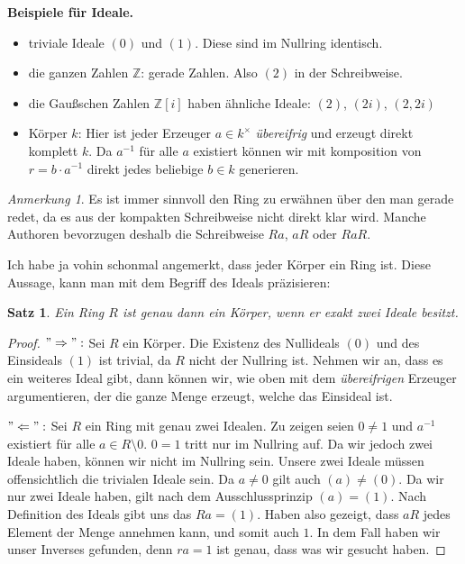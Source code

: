 \documentclass{article}
\newtheorem*{satz}{Satz}
\theoremstyle{definition}
\theoremstyle{remark}
\newtheorem*{anm}{Anmerkung}
\begin{document}
\vspace{0.7em}
\textbf{Beispiele für Ideale.}
\begin{itemize}
    \item triviale Ideale $(0)$ und $(1)$. Diese sind im Nullring identisch.
    \item die ganzen Zahlen $\mathbb Z$: gerade Zahlen. Also $(2)$ in der Schreibweise.
    \item die Gaußschen Zahlen $\mathbb Z[i]$ haben ähnliche Ideale: $(2)$, $(2i)$, $(2,2i)$
    \item Körper $k$: Hier ist jeder Erzeuger $a\in k^\times$ \emph{übereifrig} und erzeugt direkt komplett $k$.
    Da $a^{-1}$ für alle $a$ existiert können wir mit komposition von $r=b\cdot a^{-1}$ direkt jedes beliebige
    $b\in k$ generieren.
\end{itemize}

\begin{anm}
Es ist immer sinnvoll den Ring zu erwähnen über den man gerade redet, da es aus der kompakten Schreibweise
nicht direkt klar wird. Manche Authoren bevorzugen deshalb die Schreibweise $Ra$, $aR$ oder $RaR$.
\end{anm}

Ich habe ja vohin schonmal angemerkt, dass jeder Körper ein Ring ist. Diese Aussage, kann man mit dem
Begriff des Ideals präzisieren:

\begin{satz}
Ein Ring $R$ ist genau dann ein Körper, wenn er exakt zwei Ideale besitzt.
\end{satz}
\begin{proof} $"\Rightarrow":$ Sei $R$ ein Körper. Die Existenz des Nullideals $(0)$ und des Einsideals $(1)$
ist trivial, da $R$ nicht der Nullring ist. Nehmen wir an, dass es ein weiteres Ideal gibt, dann können wir,
wie oben mit dem \emph{übereifrigen} Erzeuger argumentieren, der die ganze Menge erzeugt, welche das Einsideal
ist.

\vspace{0.7em}
$"\Leftarrow":$ Sei $R$ ein Ring mit genau zwei Idealen. Zu zeigen seien $0\ne1$ und $a^{-1}$ existiert für
alle $a\in R\setminus 0$. $0=1$ tritt nur im Nullring auf. Da wir jedoch zwei Ideale haben, können wir nicht im
Nullring sein. Unsere zwei Ideale müssen offensichtlich die trivialen Ideale sein. Da $a\ne0$ gilt auch
$(a)\ne(0)$. Da wir nur zwei Ideale haben, gilt nach dem Ausschlussprinzip $(a)=(1)$. Nach Definition des Ideals
gibt uns das $Ra=(1)$. Haben also gezeigt, dass $aR$ jedes Element der Menge annehmen kann, und somit auch $1$.
In dem Fall haben wir unser Inverses gefunden, denn $ra=1$ ist genau, dass was wir gesucht haben.
\end{proof}
\end{document}
